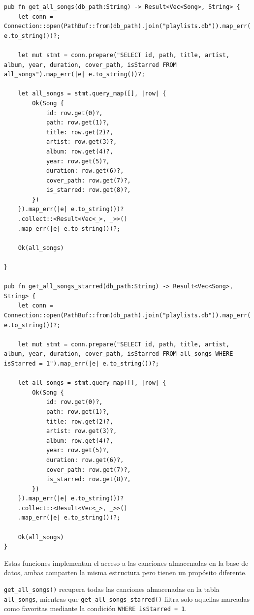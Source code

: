 \documentclass[11pt, a4paper]{article}
\begin{document}
            \begin{lstlisting}[caption={fn get\_all\_songs() y fn get\_all\_songs\_starred()}]
pub fn get_all_songs(db_path:String) -> Result<Vec<Song>, String> {
    let conn = Connection::open(PathBuf::from(db_path).join("playlists.db")).map_err(|e| e.to_string())?;

    let mut stmt = conn.prepare("SELECT id, path, title, artist, album, year, duration, cover_path, isStarred FROM all_songs").map_err(|e| e.to_string())?;

    let all_songs = stmt.query_map([], |row| {
        Ok(Song {
            id: row.get(0)?,
            path: row.get(1)?,
            title: row.get(2)?,
            artist: row.get(3)?,
            album: row.get(4)?,
            year: row.get(5)?,
            duration: row.get(6)?,
            cover_path: row.get(7)?,
            is_starred: row.get(8)?,
        })
    }).map_err(|e| e.to_string())?
    .collect::<Result<Vec<_>, _>>()
    .map_err(|e| e.to_string())?;

    Ok(all_songs)

}

pub fn get_all_songs_starred(db_path:String) -> Result<Vec<Song>, String> {
    let conn = Connection::open(PathBuf::from(db_path).join("playlists.db")).map_err(|e| e.to_string())?;

    let mut stmt = conn.prepare("SELECT id, path, title, artist, album, year, duration, cover_path, isStarred FROM all_songs WHERE isStarred = 1").map_err(|e| e.to_string())?;

    let all_songs = stmt.query_map([], |row| {
        Ok(Song {
            id: row.get(0)?,
            path: row.get(1)?,
            title: row.get(2)?,
            artist: row.get(3)?,
            album: row.get(4)?,
            year: row.get(5)?,
            duration: row.get(6)?,
            cover_path: row.get(7)?,
            is_starred: row.get(8)?,
        })
    }).map_err(|e| e.to_string())?
    .collect::<Result<Vec<_>, _>>()
    .map_err(|e| e.to_string())?;

    Ok(all_songs)
}
            \end{lstlisting}

            Estas funciones implementan el acceso a las canciones almacenadas en la base de datos, ambas comparten la misma estructura pero tienen un propósito diferente.

            \texttt{get\_all\_songs()} recupera todas las canciones almacenadas en la tabla \texttt{all\_songs}, mientras que \texttt{get\_all\_songs\_starred()} filtra solo aquellas marcadas como favoritas mediante la condición \texttt{WHERE isStarred = 1}.
\end{document}
